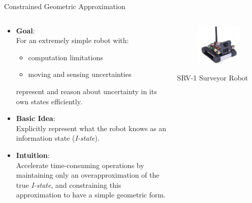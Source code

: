 \documentclass[10pt]{beamer}
\begin{document}
\begin{frame}{Constrained Geometric Approximation}
\begin{columns}
  \begin{column}{.65\textwidth}
    \begin{itemize}
    \item \textbf{Goal}:\\
    For an extremely simple robot with:
    \begin{itemize}
    \item computation limitations
    \item moving and sensing uncertainties
    \end{itemize}
    represent and reason about uncertainty in its own states efficiently.\\
    \item \textbf{Basic Idea}:\\
    Explicitly represent what the robot knows as an information state (\textit{I-state}).
    \item \textbf{Intuition}:\\
    Accelerate time-consuming operations by maintaining only an \textcolor[rgb]{1.00,0.00,0.00}{overapproximation} of the true
    \emph{I-state}, and constraining this approximation
    to have a simple geometric form.\\
    \end{itemize}
  \end{column}
  \begin{column}{.35\textwidth}
    \begin{figure}
    \includegraphics[scale=0.27]{figs/srvq.jpg}
    \end{figure}
    SRV-1 Surveyor Robot
  \end{column}
\end{columns}
\end{frame}
\end{document}
